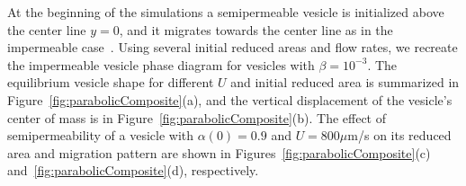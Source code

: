 \documentclass[9pt,twocolumn,twoside,lineno]{pnas-new}
\begin{document}
%
%
%
%
%
%

At the beginning of the simulations a semipermeable vesicle is
initialized above the center line $y=0$, and it migrates towards the
center line as in the impermeable case~\cite{dan-vla-mis2009}. 
%
%
%
Using several initial reduced areas and flow rates, we recreate the
impermeable vesicle phase diagram for vesicles with $\beta = 10^{-3}$.
The equilibrium vesicle shape for different $U$ and initial reduced area
is summarized in Figure~\ref{fig:parabolicComposite}(a), and the
vertical displacement of the vesicle's center of mass is in
Figure~\ref{fig:parabolicComposite}(b). The effect of semipermeability
of a vesicle with $\alpha(0) = 0.9$ and $U=800 \mu$m/s on its reduced
area and migration pattern are shown in
Figures~\ref{fig:parabolicComposite}(c)
and~\ref{fig:parabolicComposite}(d), respectively. 
\end{document}
